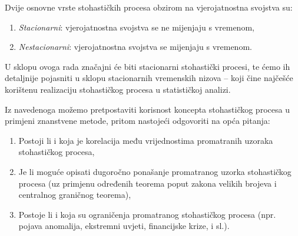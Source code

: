 \documentclass[a4paper,12pt,oneside]{memoir}
\begin{document}
            Dvije osnovne vrste stohastičkih procesa obzirom na vjerojatnostna svojstva su:

            \begin{enumerate}
                \item \textit{Stacionarni}: vjerojatnostna svojstva se ne mijenjaju s vremenom,
                \item \textit{Nestacionarni}: vjerojatnostna svojstva se mijenjaju s vremenom.
            \end{enumerate}

            U sklopu ovoga rada značajni će biti stacionarni stohastički procesi, te ćemo ih detaljnije pojasniti u sklopu stacionarnih vremenskih nizova -- koji čine najčešće korištenu realizaciju stohastičkog procesa u statističkoj analizi.

            Iz navedenoga možemo pretpostaviti korisnost koncepta stohastičkog procesa u primjeni znanstvene metode, pritom nastojeći odgovoriti na opća pitanja:

            \begin{enumerate}
                \item Postoji li i koja je korelacija među vrijednostima promatranih uzoraka stohastičkog procesa,
                \item Je li moguće opisati dugoročno ponašanje promatranog uzorka stohastičkog procesa (uz primjenu određenih teorema poput zakona velikih brojeva i centralnog graničnog teorema),
                \item Postoje li i koja su ograničenja promatranog stohastičkog procesa (npr. pojava anomalija, ekstremni uvjeti, financijske krize, i sl.).
            \end{enumerate}



\end{document}
